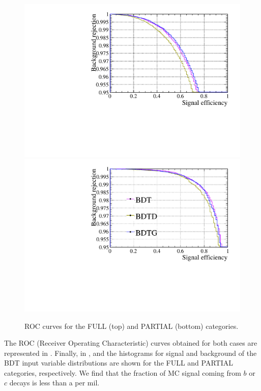 \begin{figure} [htb!]
\begin{center}
\includegraphics[scale=0.50]{figs/GL_BDT_Kspi0_pi0.pdf}
\includegraphics[scale=0.50]{figs/ROC_PARTIAL_noGhost.pdf}%
\caption{ROC curves for the FULL (top) and PARTIAL (bottom) categories.  \label{fig:ROC}} %
\end{center}

\end{figure}

The ROC (Receiver Operating Characteristic) curves obtained for both cases are represented in . 
Finally, in ,  and  the histograms for signal and background of the BDT input variable distributions are shown for the 
FULL and PARTIAL categories, respectively. 
We find that the fraction of MC signal \KS coming from $b$ or $c$ decays
is less than a per mil.

